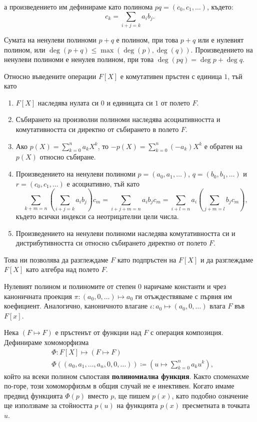 \documentclass[numbers=endperiod, bibliography=totocnumbered]{scrartcl}
\begin{document}
а произведението им дефинираме като полинома \( pq = (c_0, c_1, \ldots) \), където:
\begin{equation*}
  c_k = \sum_{i+j=k} a_i b_j.
\end{equation*}

Сумата на ненулеви полиноми \( p + q \) е полином, при това \( p + q \) или е нулевият полином, или \( \deg(p + q) \leq \max(\deg(p), \deg(q)) \). Произведението на ненулеви полиноми е ненулев полином, при това \( \deg(pq) = \deg p + \deg q \).

Относно въведените операции \( F[X] \) е комутативен пръстен с единица \( 1 \), тъй като
\begin{enumerate}
  \item \( F[X] \) наследява нулата си \( 0 \) и единицата си \( 1 \) от полето \( F \).
  \item Събирането на произволни полиноми наследява асоциативността и комутативността си директно от събирането в полето \( F \).
  \item Ако \( p(X) = \sum_{k=0}^n a_k X^k \), то \( -p(X) = \sum_{k=0}^n (-a_k) X^k \) е обратен на \( p(X) \) относно събиране.
  \item Произведението на ненулеви полиноми \( p = (a_0, a_1, \ldots) \), \( q = (b_0, b_1, \ldots) \) и \( r = (c_0, c_1, \ldots) \) е асоциативно, тъй като
  \begin{equation*}
    \sum_{k+m=n} \left(\sum_{i+j=k} a_i b_j \right) c_m
    =
    \sum_{i+j+m=n} a_i b_j c_m
    =
    \sum_{i+l=n} a_i \left( \sum_{j+m=l} b_j c_m \right),
  \end{equation*}
  където всички индекси са неотрицателни цели числа.
  \item Произведението на ненулеви полиноми наследява комутативността си и дистрибутивността си относно събирането директно от полето \( F \).
\end{enumerate}

Това ни позволява да разглеждаме \( F \) като подпръстен на \( F[X] \) и да разглеждаме \( F[X] \) като алгебра над полето \( F \).

Нулевият полином и полиномите от степен \( 0 \) наричаме константи и чрез каноничната проекция \( \pi: (a_0, 0, \ldots) \mapsto a_0 \) ги отъждествяваме с първия им коефициент. Аналогично, каноничното влагане \( \iota: a_0 \mapsto (a_0, 0, \ldots) \) влага \( F \) във \( F[x] \).

Нека \( (F \mapsto F) \) е пръстенът от функции над \( F \) с операция композиция. Дефинираме хомоморфизма
\begin{align*}
  &\Phi: F[X] \mapsto (F \mapsto F) \\
  &\Phi\left((a_0, a_1, \ldots, a_n, 0, 0, \ldots) \right) \coloneqq \left( u \mapsto \sum_{k=0}^n a_k u^k \right),
\end{align*}
който на всеки полином съпоставя \textbf{полиномиална функция}. Както споменахме по-горе, този хомоморфизъм в общия случай не е инективен. Когато имаме предвид функцията \( \Phi(p) \) вместо \( p \), ще пишем \( p(x) \), като подобно означение ще използваме за стойността \( p(u) \) на функцията \( p(x) \) пресметната в точката \( u \).
\end{document}
